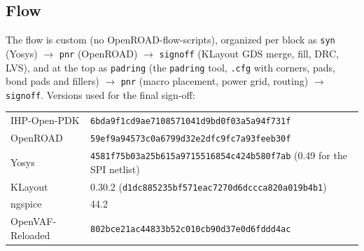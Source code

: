 \documentclass[10pt,a4paper]{article}
\begin{document}
\subsection{Flow}
The flow is custom (no OpenROAD-flow-scripts), organized per block as
\texttt{syn} (Yosys) $\to$ \texttt{pnr} (OpenROAD) $\to$ \texttt{signoff} (KLayout GDS merge, fill,
DRC, LVS), and at the top as \texttt{padring} (the \texttt{padring} tool, \texttt{.cfg} with corners,
pads, bond pads and fillers) $\to$ \texttt{pnr} (macro placement, power grid, routing) $\to$
\texttt{signoff}. Versions used for the final sign-off:
\begin{center}\small
\begin{tabular}{ll}
\toprule
IHP-Open-PDK & \texttt{6bda9f1cd9ae7108571041d9bd0f03a5a94f731f} \\
OpenROAD & \texttt{59ef9a94573c0a6799d32e2dfc9fc7a93feeb30f} \\
Yosys & \texttt{4581f75b03a25b615a9715516854c424b580f7ab} (0.49 for the SPI netlist) \\
KLayout & 0.30.2 (\texttt{d1dc885235bf571eac7270d6dccca820a019b4b1}) \\
ngspice & 44.2 \\
OpenVAF-Reloaded & \texttt{802bce21ac44833b52c010cb90d37e0d6fddd4ac} \\
\bottomrule
\end{tabular}
\end{center}
\end{document}
